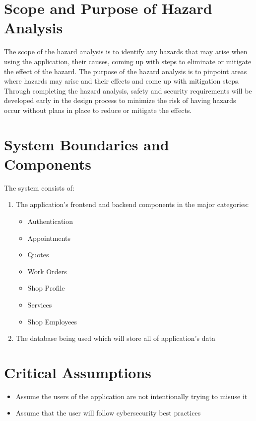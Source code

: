 \documentclass{article}
\begin{document}
\section{Scope and Purpose of Hazard Analysis}
The scope of the hazard analysis is to identify any hazards that may arise when using the
application, their causes, coming up with steps to eliminate or mitigate the effect of the hazard.
The purpose of the hazard analysis is to pinpoint areas where hazards may arise and their effects
and come up with mitigation steps. Through completing the hazard analysis, safety and security
requirements will be developed early in the design process to minimize the risk of having hazards
occur without plans in place to reduce or mitigate the effects.

\section{System Boundaries and Components}
The system consists of:
\begin{enumerate}
	\item The application's frontend and backend components in the major categories:
	      \begin{itemize}
		      \item Authentication
		      \item Appointments
		      \item Quotes
		      \item Work Orders
		      \item Shop Profile
		      \item Services
		      \item Shop Employees
	      \end{itemize}
	\item The database being used which will store all of application's data
\end{enumerate}

\section{Critical Assumptions}
\begin{itemize}
	\item Assume the users of the application are not intentionally trying to misuse it
	\item Assume that the user will follow cybersecurity best practices
\end{itemize}
\end{document}
